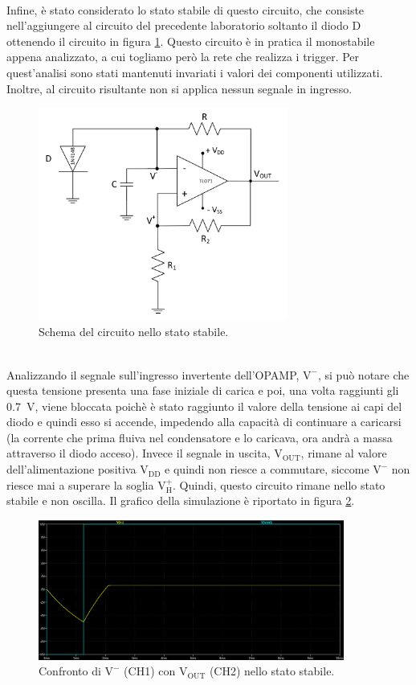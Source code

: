 \documentclass{report}
\begin{document}
\\Infine, è stato considerato lo stato stabile di questo circuito, che consiste nell'aggiungere al circuito del precedente laboratorio soltanto il diodo D ottenendo il circuito in figura \ref{figura:schema1stabile}.  Questo circuito è in pratica il monostabile appena analizzato, a cui togliamo però la rete che realizza i trigger. Per quest'analisi sono stati mantenuti invariati i valori dei componenti utilizzati. Inoltre, al circuito risultante non si applica nessun segnale in ingresso.
\begin{figure}[h!]
	\centering
	\includegraphics[height=7cm]{immagini/schema1stabile}
	\caption{Schema del circuito nello stato stabile.}
	\label{figura:schema1stabile}
\end{figure}
\\Analizzando il segnale sull'ingresso invertente dell'OPAMP, $\mathrm{V^-}$, si può notare che questa tensione presenta una fase iniziale di carica e poi, una volta raggiunti gli \SI{0.7}{\volt}, viene bloccata poichè è stato raggiunto il valore della tensione ai capi del diodo e quindi esso si accende, impedendo alla capacità di continuare a caricarsi (la corrente che prima fluiva nel condensatore e lo caricava, ora andrà a massa attraverso il diodo acceso). Invece il segnale in uscita, $\mathrm{V_{OUT}}$, rimane al valore dell'alimentazione positiva $\mathrm{V_{DD}}$ e quindi non riesce a commutare, siccome $\mathrm{V^-}$ non riesce mai a superare la soglia $\mathrm{V_H^+}$. Quindi, questo circuito rimane nello stato stabile e  non oscilla. Il grafico della simulazione è riportato in figura \ref{figura:simulazione1}. 
\begin{figure}[h!]
	\centering
	\includegraphics[height=4.6cm]{immagini/plot_sim_stabile}
	\caption{Confronto di $\mathrm{V^-}$ (CH1) con $\mathrm{V_{OUT}}$ (CH2) nello stato stabile.}
	\label{figura:simulazione1}
\end{figure}
\end{document}
